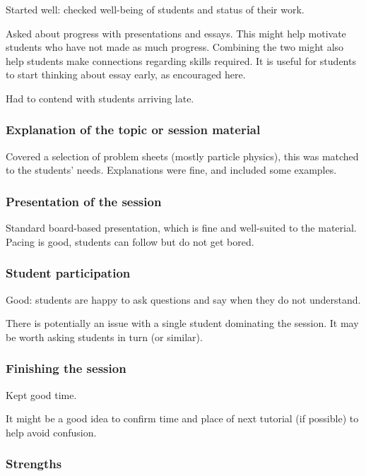 Started well: checked well-being of students and status of their work.

Asked about progress with presentations and essays. This might help motivate students who have not made as much progress. Combining the two might also help students make connections regarding skills required. It is useful for students to start thinking about essay early, as encouraged here.

Had to contend with students arriving late.

\subsubsection{Explanation of the topic or session material}

Covered a selection of problem sheets (mostly particle physics), this was matched to the students' needs. Explanations were fine, and included some examples.

\subsubsection{Presentation of the session}

Standard board-based presentation, which is fine and well-suited to the material. Pacing is good, students can follow but do not get bored.

\subsubsection{Student participation}\label{sec:other-participation}

Good: students are happy to ask questions and say when they do not understand.

There is potentially an issue with a single student dominating the session. It may be worth asking students in turn (or similar).

\subsubsection{Finishing the session}

Kept good time.

It might be a good idea to confirm time and place of next tutorial (if possible) to help avoid confusion.

\subsubsection{Strengths}\label{sec:other-tutorial-strengths}

